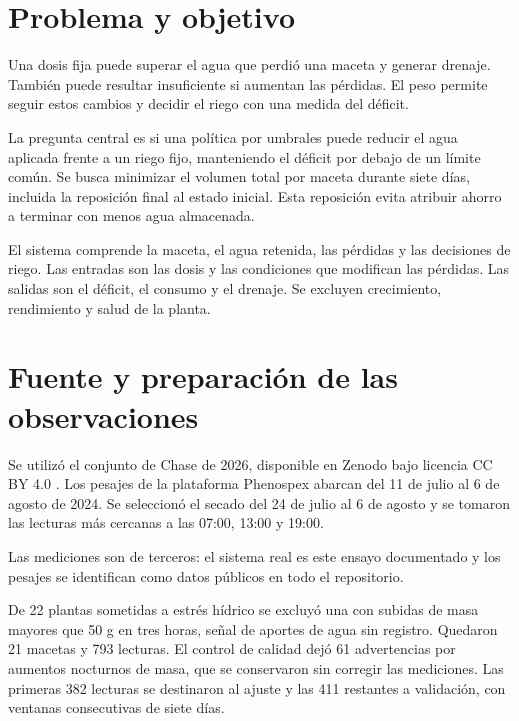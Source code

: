 \documentclass[12pt]{article}
\begin{document}
\section{Problema y objetivo}

Una dosis fija puede superar el agua que perdió una maceta y generar drenaje. También puede resultar insuficiente si aumentan las pérdidas. El peso permite seguir estos cambios y decidir el riego con una medida del déficit.

La pregunta central es si una política por umbrales puede reducir el agua aplicada frente a un riego fijo, manteniendo el déficit por debajo de un límite común. Se busca minimizar el volumen total por maceta durante siete días, incluida la reposición final al estado inicial. Esta reposición evita atribuir ahorro a terminar con menos agua almacenada.

El sistema comprende la maceta, el agua retenida, las pérdidas y las decisiones de riego. Las entradas son las dosis y las condiciones que modifican las pérdidas. Las salidas son el déficit, el consumo y el drenaje. Se excluyen crecimiento, rendimiento y salud de la planta.

\section{Fuente y preparación de las observaciones}

Se utilizó el conjunto de Chase de 2026, disponible en Zenodo bajo licencia CC BY 4.0 \cite{chase}. Los pesajes de la plataforma Phenospex abarcan del 11 de julio al 6 de agosto de 2024. Se seleccionó el secado del 24 de julio al 6 de agosto y se tomaron las lecturas más cercanas a las 07:00, 13:00 y 19:00.

Las mediciones son de terceros: el sistema real es este ensayo documentado y los pesajes se identifican como datos públicos en todo el repositorio.

De 22 plantas sometidas a estrés hídrico se excluyó una con subidas de masa mayores que 50 g en tres horas, señal de aportes de agua sin registro. Quedaron 21 macetas y 793 lecturas. El control de calidad dejó 61 advertencias por aumentos nocturnos de masa, que se conservaron sin corregir las mediciones. Las primeras 382 lecturas se destinaron al ajuste y las 411 restantes a validación, con ventanas consecutivas de siete días.
\end{document}
